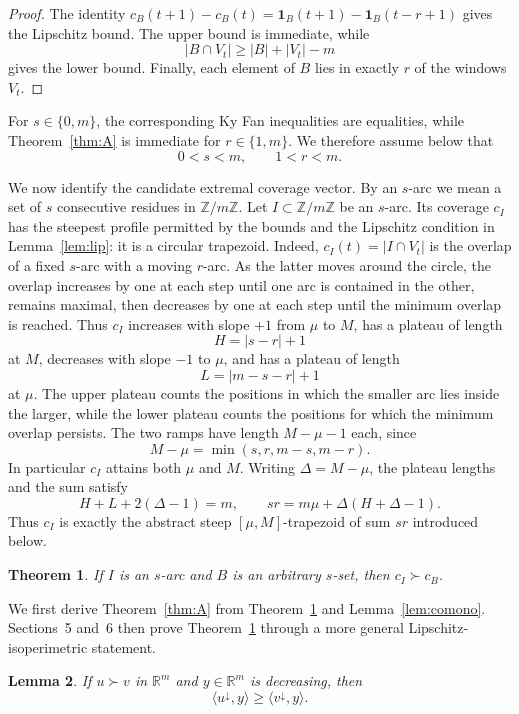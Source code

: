 \documentclass[11pt]{article}
\newtheorem{theorem}{Theorem}[section]
\newtheorem{lemma}[theorem]{Lemma}
\theoremstyle{definition}
\newcommand{\Z}{\mathbb{Z}}
\newcommand{\R}{\mathbb{R}}
\newcommand{\ind}{\mathbf{1}}
\begin{document}
\begin{proof}
The identity $c_B(t+1)-c_B(t)=\ind_B(t+1)-\ind_B(t-r+1)$ gives the Lipschitz bound. The upper bound is immediate, while
\[
|B\cap V_t|\ge|B|+|V_t|-m
\]
gives the lower bound. Finally, each element of $B$ lies in exactly $r$ of the windows $V_t$.
\end{proof}

For $s\in\{0,m\}$, the corresponding Ky Fan inequalities are equalities, while Theorem~\ref{thm:A} is immediate for $r\in\{1,m\}$. We therefore assume below that
\[
0<s<m,
\qquad
1<r<m.
\]

We now identify the candidate extremal coverage vector. By an $s$-arc we mean a set of $s$ consecutive residues in $\Z/m\Z$. Let $I\subset\Z/m\Z$ be an $s$-arc. Its coverage $c_I$ has the steepest profile permitted by the bounds and the Lipschitz condition in Lemma~\ref{lem:lip}: it is a circular trapezoid. Indeed, $c_I(t)=|I\cap V_t|$ is the overlap of a fixed $s$-arc with a moving $r$-arc. As the latter moves around the circle, the overlap increases by one at each step until one arc is contained in the other, remains maximal, then decreases by one at each step until the minimum overlap is reached. Thus $c_I$ increases with slope $+1$ from $\mu$ to $M$, has a plateau of length
\[
H=|s-r|+1
\]
at $M$, decreases with slope $-1$ to $\mu$, and has a plateau of length
\[
L=|m-s-r|+1
\]
at $\mu$. The upper plateau counts the positions in which the smaller arc lies inside the larger, while the lower plateau counts the positions for which the minimum overlap persists. The two ramps have length $M-\mu-1$ each, since
\[
M-\mu=\min(s,r,m-s,m-r).
\]
In particular $c_I$ attains both $\mu$ and $M$. Writing $\Delta=M-\mu$, the plateau lengths and the sum satisfy
\[
H+L+2(\Delta-1)=m,
\qquad
sr=m\mu+\Delta(H+\Delta-1).
\]
Thus $c_I$ is exactly the abstract steep $[\mu,M]$-trapezoid of sum $sr$ introduced below.

\begin{theorem}\label{thm:B}
If $I$ is an $s$-arc and $B$ is an arbitrary $s$-set, then $c_I\succ c_B$.
\end{theorem}

We first derive Theorem~\ref{thm:A} from Theorem~\ref{thm:B} and Lemma~\ref{lem:comono}. Sections~5 and~6 then prove Theorem~\ref{thm:B} through a more general Lipschitz-isoperimetric statement.

\begin{lemma}\label{lem:pair}
If $u\succ v$ in $\R^m$ and $y\in\R^m$ is decreasing, then
\[
\langle u^\downarrow,y\rangle\ge\langle v^\downarrow,y\rangle.
\]
\end{lemma}
\end{document}
